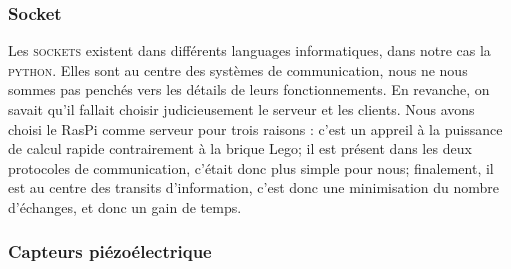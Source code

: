 \documentclass[twoside,twocolumn, 16pt]{article}
\begin{document}
\subsubsection{Socket}
Les \textsc{sockets} existent dans différents languages informatiques, dans notre cas la \textsc{python}. Elles sont au centre des systèmes de communication, nous ne nous sommes pas penchés vers les détails de leurs fonctionnements. En revanche, on savait qu'il fallait choisir judicieusement le serveur et les clients. Nous avons choisi le RasPi comme serveur pour trois raisons : c'est un appreil à la puissance de calcul rapide contrairement à la brique Lego; il est présent dans les deux protocoles de communication, c'était donc plus simple pour nous; finalement, il est au centre des transits d'information, c'est donc une minimisation du nombre d'échanges, et donc un gain de temps. 

\subsubsection{Capteurs piézoélectrique}
\end{document}
